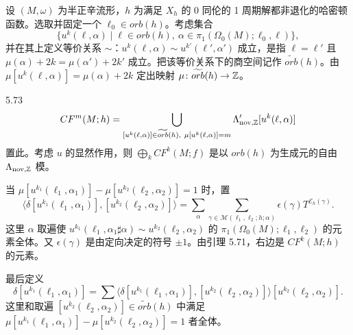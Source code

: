 设 $(M,\omega)$ 为半正辛流形，$h$ 为满足 $X_h$ 的 0 同伦的 1 周期解都非退化的哈密顿函数。选取并固定一个 $\ell_0\in orb(h)$。考虑集合
\[
  \{u^k(\ell,\alpha)\mid\ell\in orb(h),\ \alpha\in\pi_1(\Omega_0(M);\ell_0,\ell)\},
\]
并在其上定义等价关系 $\sim$：$u^k(\ell,\alpha)\sim u^{k'}(\ell',\alpha')$ 成立，是指 $\ell=\ell'$ 且 $\mu(\alpha)+2k=\mu(\alpha')+2k'$ 成立。把该等价关系下的商空间记作 $\widetilde{orb}(h)$。由 $\mu[u^k(\ell,\alpha)]=\mu(\alpha)+2k$ 定出映射 $\mu\colon\widetilde{orb}(h)\to\mathbb{Z}$。

\begin{definition}{5.73}
  \[
    CF^m(M;h)=\bigcup_{[u^k(\ell,\alpha)]\in\widetilde{orb}(h),\ \mu[u^k(\ell,\alpha)]=m}
    \Lambda'_{\mathrm{nov},\Z}[u^k(\ell,\alpha)]
  \]
  置此。考虑 $u$ 的显然作用，则 $\bigoplus_kCF^k(M;f)$ 是以 $orb(h)$ 为生成元的自由 $\Lambda_{\mathrm{nov},\mathbb{Z}}$ 模。

  当 $\mu[u^{k_1}(\ell_1,\alpha_1)]-\mu[u^{k_2}(\ell_2,\alpha_2)]=1$ 时，置
  \[
    \langle\delta[u^{k_1}(\ell_1,\alpha_1)],[u^{k_2}(\ell_2,\alpha_2)]\rangle
    =\sum_\alpha\sum_{\gamma\in\mathcal{M}(\ell_1,\ell_2;h;\alpha)}\epsilon(\gamma)T^{\mathcal{E}_h(\gamma)}.
  \]
  这里 $\alpha$ 取遍使 $u^{k_1}(\ell_1,\alpha_1\sharp\alpha)\sim u^{k_2}(\ell_2,\alpha_2)$ 的 $\pi_1(\Omega_0(M);\ell_1,\ell_2)$ 的元素全体。又 $\epsilon(\gamma)$ 是由定向决定的符号 $\pm1$。由引理 5.71，右边是 $CF^k(M;h)$ 的元素。

  最后定义
  \[
    \delta[u^{k_1}(\ell_1,\alpha_1)]
    =\sum\langle\delta[u^{k_1}(\ell_1,\alpha_1)],
    [u^{k_2}(\ell_2,\alpha_2)]\rangle[u^{k_2}(\ell_2,\alpha_2)].
  \]
  这里和取遍 $[u^{k_2}(\ell_2,\alpha_2)]\in\widetilde{orb}(h)$ 中满足 $\mu[u^{k_1}(\ell_1,\alpha_1)]-\mu[u^{k_2}(\ell_2,\alpha_2)]=1$ 者全体。
\end{definition}


